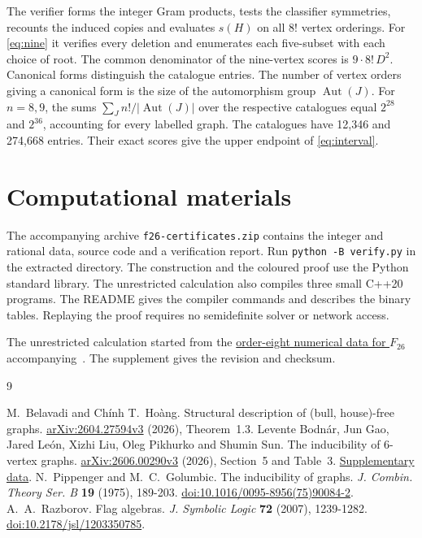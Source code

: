 \documentclass[11pt,a4paper]{article}
\DeclareMathOperator{\Aut}{Aut}
\begin{document}
The verifier forms the integer Gram products, tests the classifier symmetries, recounts the induced copies and evaluates \(s(H)\) on all \(8!\) vertex orderings. For \eqref{eq:nine} it verifies every deletion and enumerates each five-subset with each choice of root. The common denominator of the nine-vertex scores is \(9\cdot8!\,D^2\). Canonical forms distinguish the catalogue entries. The number of vertex orders giving a canonical form is the size of the automorphism group \(\Aut(J)\). For \(n=8,9\), the sums \(\sum_J n!/|\Aut(J)|\) over the respective catalogues equal \(2^{28}\) and \(2^{36}\), accounting for every labelled graph. The catalogues have 12,346 and 274,668 entries. Their exact scores give the upper endpoint of \eqref{eq:interval}.

\section*{Computational materials}

The accompanying archive \texttt{f26-certificates.zip} contains the integer and rational data, source code and a verification report. Run \mbox{\texttt{python -B verify.py}} in the extracted directory. The construction and the coloured proof use the Python standard library. The unrestricted calculation also compiles three small C++20 programs. The README gives the compiler commands and describes the binary tables. Replaying the proof requires no semidefinite solver or network access.

The unrestricted calculation started from the \href{https://github.com/bodnalev/supplementary_files/blob/9f356bb3dc10dcacd4d26a4eb1d556c2650e4e1b/graph_inducibility_6vtx/certs/inexact_26.pickle}{order-eight numerical data for \(F_{26}\)} accompanying~\cite{six}. The supplement gives the revision and checksum.

\begin{thebibliography}{9}
\small\raggedright\setlength{\itemsep}{3pt}
 M.~Belavadi and Ch\'inh T.~Ho\`ang.
Structural description of (bull, house)-free graphs.
\href{https://arxiv.org/abs/2604.27594v3}{arXiv:2604.27594v3} (2026), Theorem~1.3.
 Levente Bodn\'ar, Jun Gao, Jared Le\'on, Xizhi Liu, Oleg Pikhurko and Shumin Sun.
The inducibility of 6-vertex graphs.
\href{https://arxiv.org/abs/2606.00290v3}{arXiv:2606.00290v3} (2026), Section~5 and Table~3.
\href{https://github.com/bodnalev/supplementary_files/tree/9f356bb3dc10dcacd4d26a4eb1d556c2650e4e1b/graph_inducibility_6vtx}{Supplementary data}.
 N.~Pippenger and M.~C.~Golumbic. The inducibility of graphs.
\emph{J. Combin. Theory Ser. B} \textbf{19} (1975), 189-203.
\href{https://doi.org/10.1016/0095-8956(75)90084-2}{doi:10.1016/0095-8956(75)90084-2}.
 A.~A.~Razborov. Flag algebras.
\emph{J. Symbolic Logic} \textbf{72} (2007), 1239-1282.
\href{https://doi.org/10.2178/jsl/1203350785}{doi:10.2178/jsl/1203350785}.
\end{thebibliography}
\end{document}
